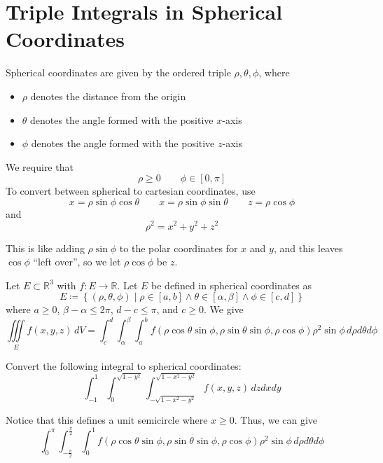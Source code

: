 \section{Triple Integrals in Spherical Coordinates}
Spherical coordinates are given by the ordered triple \(\rho ,\theta ,\phi \), where 
\begin{itemize}
    \item \(\rho \) denotes the distance from the origin
    \item \(\theta \) denotes the angle formed with the positive \(x\)-axis
    \item \(\phi \) denotes the angle formed with the positive \(z\)-axis
\end{itemize}
We require that
\[
    \rho \geq 0\qquad \phi \in[0,\pi ]
\]
To convert between spherical to cartesian coordinates, use 
\[
    x=\rho \sin \phi \cos \theta \qquad x=\rho \sin \phi \sin \theta \qquad z=\rho \cos \phi 
\]
and
\[
    \rho ^2=x^2 +y^2 +z^2
\]
\begin{intuition}
    This is like adding \(\rho \sin \phi \) to the polar coordinates for \(x\) and \(y\), and this leaves \(\cos \phi \) ``left over'', so we let \(\rho \cos \phi \) be \(z\).
\end{intuition}
\begin{theorem}
    Let \(E \subset \mathbb{R}^3\) with \(f:E\to \mathbb{R}\). Let \(E\) be defined in spherical coordinates as 
    \[
        E\coloneqq \left\{ (\rho ,\theta ,\phi )\mid \rho \in[a,b]\land \theta \in[\alpha ,\beta ]\land \phi \in[c,d] \right\} 
    \]
    where \(a\geq 0\), \(\beta -\alpha \leq 2\pi \), \(d-c\leq \pi \), and \(c\geq 0\). We give 
    \[
        \iiint\limits_{E}f(x,y,z)\,dV =\int_c^d \int_\alpha^\beta \int_a^b f \left( \rho  \cos \theta \sin \phi , \rho \sin \theta \sin \phi ,\rho \cos \phi \right) \rho ^2 \sin \phi \,d \rho d \theta d \phi 
    \]
\end{theorem}
\begin{exercise}
    Convert the following integral to spherical coordinates:
    \[
        \int_{-1}^1 \int_0^{\sqrt{1-y^2} }\int_{-\sqrt{1-x^2 -y^2} }^{\sqrt{1-x^2 -y^2} } f(x,y,z)\,dzdxdy
    \]
\end{exercise}
\begin{solution}
    Notice that this defines a unit semicircle where \(x\geq 0\). Thus, we can give 
    \[
        \int_0^\pi \int_{-\frac{\pi}{2}}^{\frac{\pi}{2}}\int_0^1 f \left( \rho  \cos \theta \sin \phi , \rho \sin \theta \sin \phi ,\rho \cos \phi \right) \rho ^2 \sin \phi \,d \rho d \theta d \phi 
    \]
\end{solution}